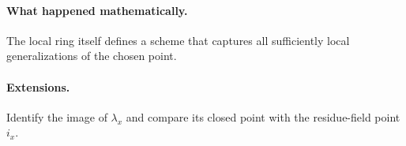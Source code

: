 \paragraph{What happened mathematically.}
The local ring itself defines a scheme that captures all sufficiently local generalizations of the chosen point.

\paragraph{Extensions.}
Identify the image of $\lambda_x$ and compare its closed point with the residue-field point $i_x$.
\fi
